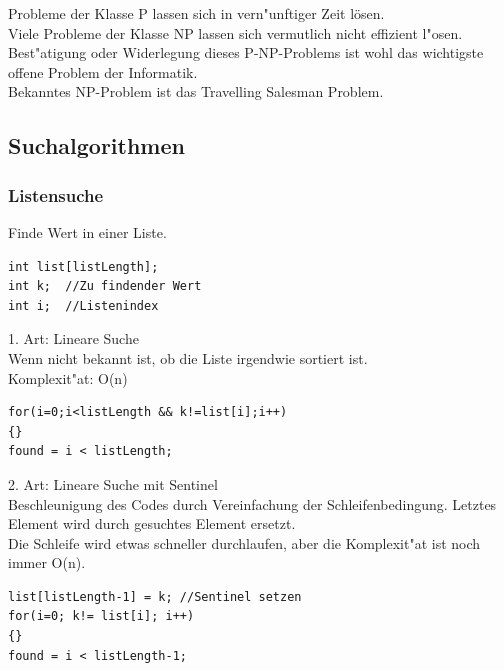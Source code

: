 Probleme der Klasse P lassen sich in vern"unftiger Zeit lösen. \\
Viele Probleme der Klasse NP lassen sich vermutlich nicht effizient l"osen.\\
Best"atigung oder Widerlegung dieses P-NP-Problems ist wohl das wichtigste offene Problem der Informatik.\\
Bekanntes NP-Problem ist das Travelling Salesman Problem.\\



\subsection{Suchalgorithmen}
\subsubsection{Listensuche}
Finde Wert in einer Liste. 
\begin{lstlisting}[style=C]
int list[listLength];
int k;	//Zu findender Wert 				
int i; 	//Listenindex
\end{lstlisting} 
1. Art: Lineare Suche\\
Wenn nicht bekannt ist, ob die Liste irgendwie sortiert ist. \\
Komplexit"at: O(n)
\begin{lstlisting}[style=C]
for(i=0;i<listLength && k!=list[i];i++)
{}
found = i < listLength; 
\end{lstlisting} 

2. Art: Lineare Suche mit Sentinel\\
Beschleunigung des Codes durch Vereinfachung der Schleifenbedingung. Letztes Element wird durch gesuchtes Element ersetzt.\\
Die Schleife wird etwas schneller durchlaufen, aber die Komplexit"at ist noch immer O(n).
\begin{lstlisting}[style=C]
list[listLength-1] = k; //Sentinel setzen
for(i=0; k!= list[i]; i++)
{}
found = i < listLength-1; 
\end{lstlisting} 

